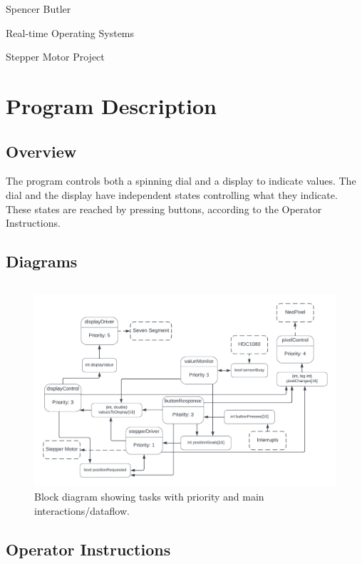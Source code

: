 \documentclass[12pt]{amsart}
\begin{document}
{\large Spencer Butler}

{\large Real-time Operating Systems}

{\large Stepper Motor Project}



\section{Program Description}

\subsection{Overview}

The program controls both a spinning dial and a display to indicate values. The dial and the display
have independent states controlling what they indicate. These states are reached by pressing buttons,
according to the Operator Instructions.

\newpage
\subsection{Diagrams}

$$ $$

\begin{figure}[h!]
    \includegraphics[width=7in]{stepperBlockDiagram}
    \caption{Block diagram showing tasks with priority and main interactions/dataflow.}
\end{figure}


\subsection{Operator Instructions}
\end{document}
